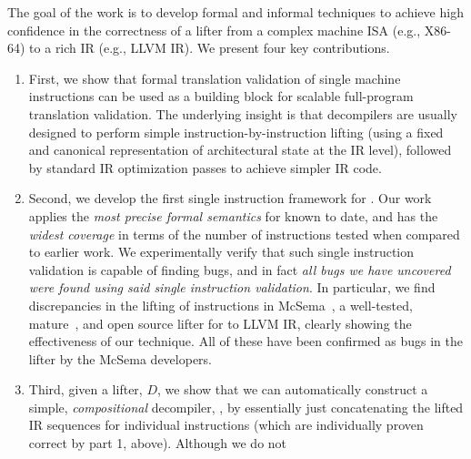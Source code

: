 
The goal of the work  is to develop formal and informal techniques
to achieve high confidence in the correctness of a lifter from a complex machine
ISA (e.g., X86-64) to a rich IR (e.g., LLVM IR).
%
We present four key contributions.
%
\begin{enumerate}
  \item First, we show that formal translation validation of single machine 
  instructions can be used as a building 
  block for scalable
  full-program translation validation.  The underlying insight is that decompilers are
  usually designed to perform simple instruction-by-instruction lifting
  (using a fixed and canonical representation of architectural state at the IR
  level), followed by standard IR optimization passes to achieve simpler IR
  code.
  \item Second, we develop the first single instruction \tv framework for \ISA.
  Our work applies the \emph{most precise formal
  semantics} for \ISA known to date, and has the \emph{widest coverage} in terms
  of the number of instructions tested when compared to earlier work.
  We experimentally verify that such single instruction validation
  is capable of finding bugs, and in fact \emph{all bugs we have uncovered were
  found using said single instruction validation}.  
  In particular, we find
  discrepancies in the lifting of \sivFail instructions in McSema~\cite{McSema:Recon14,Remill}, 
  a well-tested, mature~\cite{McSema:Compare}, and  open source lifter for \ISA to 
  LLVM IR, clearly showing the
  effectiveness of our technique.  All of these have been confirmed as bugs in
  the lifter by the McSema developers.
  \item Third, given a lifter, $D$, we show that we can automatically construct a 
  simple, \emph{compositional} decompiler, \Dp,
  by essentially just concatenating the lifted IR sequences for individual instructions
  (which are individually proven correct by part 1, above).  Although we do not

\end{enumerate}
